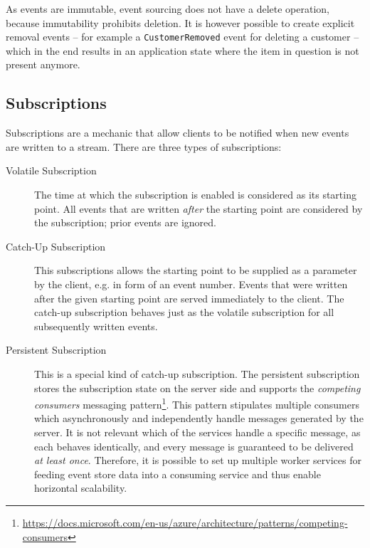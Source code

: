 
As events are immutable, event sourcing does not have a delete operation, because immutability prohibits deletion.
It is however possible to create explicit removal events -- for example a \texttt{CustomerRemoved} event for deleting a customer -- which in the end results in an application state where the item in question is not present anymore.

\cite{WEB:Fowler:2011}


\subsection{Subscriptions}

Subscriptions are a mechanic that allow clients to be notified when new events are written to a stream.
There are three types of subscriptions:

\begin{description}
\item[Volatile Subscription]
The time at which the subscription is enabled is considered as its starting point.
All events that are written \emph{after} the starting point are considered by the subscription; prior events are ignored.
\item[Catch-Up Subscription]
This subscriptions allows the starting point to be supplied as a parameter by the client, e.g. in form of an event number.
Events that were written after the given starting point are served immediately to the client.
The catch-up subscription behaves just as the volatile subscription for all subsequently written events.
\item[Persistent Subscription] 
This is a special kind of catch-up subscription.
The persistent subscription stores the subscription state on the server side and supports the \emph{competing consumers} messaging pattern\footnote{\url{https://docs.microsoft.com/en-us/azure/architecture/patterns/competing-consumers}}.
This pattern stipulates multiple consumers which asynchronously and independently handle messages generated by the server.
It is not relevant which of the services handle a specific message, as each behaves identically, and every message is guaranteed to be delivered \emph{at least once}.
Therefore, it is possible to set up multiple worker services for feeding event store data into a consuming service and thus enable horizontal scalability.
\end{description}


